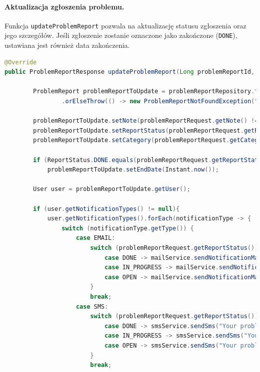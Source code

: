 \paragraph{Aktualizacja zgłoszenia problemu.}

Funkcja \texttt{updateProblemReport} pozwala na aktualizację statusu zgłoszenia oraz jego szczegółów. Jeśli zgłoszenie zostanie oznaczone jako zakończone (\texttt{DONE}), ustawiana jest również data zakończenia.

\begin{lstlisting}[language=Java, caption=Aktualizacja zgłoszenia problemu.]
@Override
public ProblemReportResponse updateProblemReport(Long problemReportId, ProblemReportRequest problemReportRequest) throws ProblemReportNotFoundException {

        ProblemReport problemReportToUpdate = problemReportRepository.findById(problemReportId)
                .orElseThrow(() -> new ProblemReportNotFoundException("Problem report not found with id: " + problemReportId));

        problemReportToUpdate.setNote(problemReportRequest.getNote() != null ? problemReportRequest.getNote() : problemReportToUpdate.getNote());
        problemReportToUpdate.setReportStatus(problemReportRequest.getReportStatus() != null ? problemReportRequest.getReportStatus() : problemReportToUpdate.getReportStatus());
        problemReportToUpdate.setCategory(problemReportRequest.getCategory() != null ? problemReportRequest.getCategory() : problemReportToUpdate.getCategory());

        if (ReportStatus.DONE.equals(problemReportRequest.getReportStatus()))
            problemReportToUpdate.setEndDate(Instant.now());

        User user = problemReportToUpdate.getUser();

        if (user.getNotificationTypes() != null){
            user.getNotificationTypes().forEach(notificationType -> {
                switch (notificationType.getType()) {
                    case EMAIL:
                        switch (problemReportRequest.getReportStatus()) {
                            case DONE -> mailService.sendNotificationMail("Problem report done", "Your problem report has been done", user.getEmail());
                            case IN_PROGRESS -> mailService.sendNotificationMail("Problem report in progress", "Your problem report is in progress", user.getEmail());
                            case OPEN -> mailService.sendNotificationMail("Problem report open", "Your problem report is open", user.getEmail());
                        }
                        break;
                    case SMS:
                        switch (problemReportRequest.getReportStatus()) {
                            case DONE -> smsService.sendSms("Your problem report has been done", user.getPhoneNumber());
                            case IN_PROGRESS -> smsService.sendSms("Your problem report is in progress", user.getPhoneNumber());
                            case OPEN -> smsService.sendSms("Your problem report is open", user.getPhoneNumber());
                        }
                        break;


\end{lstlisting}
